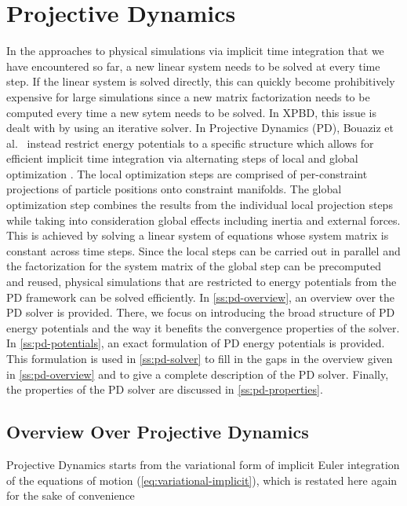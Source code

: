 \section{Projective Dynamics}\label{s:pd}

In the approaches to physical simulations via implicit time integration that we have encountered so far, a new linear system needs to be solved
at every time step. If the linear system is solved directly, this can quickly become prohibitively expensive for large simulations since 
a new matrix factorization needs to be computed every time a new sytem needs to be solved. In XPBD, this issue is dealt with by using an iterative 
solver. In Projective Dynamics (PD), Bouaziz et al.\ \cite{bouaziz2014} instead restrict energy potentials to a specific structure 
which allows for efficient implicit time integration via alternating steps of local and global optimization \cite{bouaziz2014}. The local 
optimization steps are comprised of per-constraint projections of particle positions onto constraint manifolds. The global optimization 
step combines the results from the individual 
local projection steps while taking into consideration global effects including inertia and external forces. This is achieved by solving a 
linear system of equations whose system matrix is constant across time steps. Since the local steps can be carried out in parallel and the 
factorization for the system matrix of the global step can be precomputed and reused, physical simulations that are restricted to energy 
potentials from the PD framework can be solved efficiently. In \autoref{ss:pd-overview}, an overview over the PD solver is provided. There, 
we focus on introducing the broad structure of PD energy potentials and the way it benefits the convergence properties of the solver. In 
\autoref{ss:pd-potentials}, an exact formulation of PD energy potentials is provided. This formulation is used in \autoref{ss:pd-solver} 
to fill in the gaps in the overview given in \autoref{ss:pd-overview} and to give a complete description of the PD solver. Finally, the 
properties of the PD solver are discussed in \autoref{ss:pd-properties}.

\subsection{Overview Over Projective Dynamics}\label{ss:pd-overview}
Projective Dynamics starts from the variational form of implicit Euler integration of the equations of motion (\cref{eq:variational-implicit}),
which is restated here again for the sake of convenience

